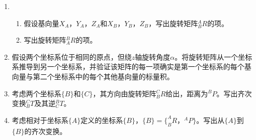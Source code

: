 \begin{enumerate}
\item 
	\begin{enumerate}
	 \item 假设基向量$X_A$，$Y_A$，$Z_A$和$X_B$，$Y_B$，$Z_B$，写出旋转矩阵$^A_BR$的项。
	 \item 写出旋转矩阵$^B_AR$的项。
	 \end{enumerate} 

\item 假设两个坐标系位于相同的原点，但绕$z$轴旋转角度$\alpha$。将旋转矩阵从一个坐标系推导到另一个坐标系，并验证该矩阵的每一项确实是第一个坐标系的每个基向量与第二个坐标系中的每个其他基向量的标量积。
\item 考虑两个坐标系$\{B\}$和$\{C\}$，其方向由旋转矩阵$^C_BR$给出，距离为$^BP$。写出齐次变换$^C_BT$及其逆$^B_CT$。
\item 考虑相对于坐标系$\{A\}$定义的坐标系$\{B\}$，$\{B\}=\{^A_BR，^AP\}$。写出从$\{A\}$到$\{B\}$的齐次变换。
\end{enumerate}

